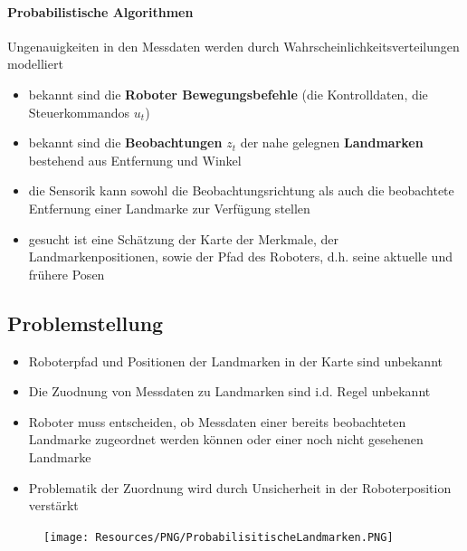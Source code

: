 \paragraph{Probabilistische Algorithmen}
Ungenauigkeiten in den Messdaten werden durch Wahrscheinlichkeitsverteilungen
modelliert
\begin{itemize}
	\item bekannt sind die \textbf{Roboter Bewegungsbefehle} (die Kontrolldaten,
		die Steuerkommandos $u_t$)
	\item bekannt sind die \textbf{Beobachtungen} $z_t$ der nahe gelegnen
		\textbf{Landmarken} bestehend aus Entfernung und Winkel
	\item die Sensorik kann sowohl die Beobachtungsrichtung als auch die
		beobachtete Entfernung einer Landmarke zur Verfügung stellen
	\item gesucht ist eine Schätzung der Karte der Merkmale, der
		Landmarkenpositionen, sowie der Pfad des Roboters, d.h. seine aktuelle und
		frühere Posen
\end{itemize}

\subsection{Problemstellung}
\begin{itemize}
	\item Roboterpfad und Positionen der Landmarken in der Karte sind unbekannt
	\item Die Zuodnung von Messdaten zu Landmarken sind i.d. Regel unbekannt
	\item Roboter muss entscheiden, ob Messdaten einer bereits beobachteten
		Landmarke zugeordnet werden können oder einer noch nicht gesehenen Landmarke
	\item Problematik der Zuordnung wird durch Unsicherheit in der
		Roboterposition verstärkt
\end{itemize}
\begin{figure}[H]
	\begin{center}
		\texttt{[image: Resources/PNG/ProbabilisitischeLandmarken.PNG]}
		\caption{}
		\label{fig:PNG/ProbabilistischeLandmarken.PNG}
	\end{center}
\end{figure}

